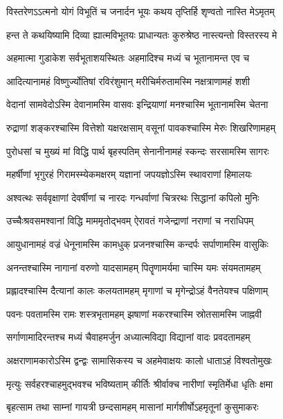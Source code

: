 \twolineshloka
{विस्तरेणऽऽत्मनो योगं विभूतिं च जनार्दन}
{भूयः कथय तृप्तिर्हि शृण्वतो नास्ति मेऽमृतम्}%

\twolineshloka
{हन्त ते कथयिष्यामि दिव्या ह्यात्मविभूतयः}
{प्राधान्यतः कुरुश्रेष्ठ नास्त्यन्तो विस्तरस्य मे}%

\twolineshloka
{अहमात्मा गुडाकेश सर्वभूताशयस्थितः}
{अहमादिश्च मध्यं च भूतानामन्त एव च}%

\twolineshloka
{आदित्यानामहं विष्णुर्ज्योतिषां रविरंशुमान्}
{मरीचिर्मरुतामस्मि नक्षत्राणामहं शशी}%

\twolineshloka
{वेदानां सामवेदोऽस्मि देवानामस्मि वासवः}
{इन्द्रियाणां मनश्चास्मि भूतानामस्मि चेतना}%

\twolineshloka
{रुद्राणां शङ्करश्चास्मि वित्तेशो यक्षरक्षसाम्}
{वसूनां पावकश्चास्मि मेरुः शिखरिणामहम्}%

\twolineshloka
{पुरोधसां च मुख्यं मां विद्धि पार्थ बृहस्पतिम्}
{सेनानीनामहं स्कन्दः सरसामस्मि सागरः}%

\twolineshloka
{महर्षीणां भृगुरहं गिरामस्म्येकमक्षरम्}
{यज्ञानां जपयज्ञोऽस्मि स्थावराणां हिमालयः}%

\twolineshloka
{अश्वत्थः सर्ववृक्षाणां देवर्षीणां च नारदः}
{गन्धर्वाणां चित्ररथः सिद्धानां कपिलो मुनिः}%

\twolineshloka
{उच्चैःश्रवसमश्वानां विद्धि माममृतोद्भवम्}
{ऐरावतं गजेन्द्राणां नराणां च नराधिपम्}%

\twolineshloka
{आयुधानामहं वज्रं धेनूनामस्मि कामधुक्}
{प्रजनश्चास्मि कन्दर्पः सर्पाणामस्मि वासुकिः}%

\twolineshloka
{अनन्तश्चास्मि नागानां वरुणो यादसामहम्}
{पितॄणामर्यमा चास्मि यमः संयमतामहम्}%

\twolineshloka
{प्रह्लादश्चास्मि दैत्यानां कालः कलयतामहम्}
{मृगाणां च मृगेन्द्रोऽहं वैनतेयश्च पक्षिणाम्}%

\twolineshloka
{पवनः पवतामस्मि रामः शस्त्रभृतामहम्}
{झषाणां मकरश्चास्मि स्रोतसामस्मि जाह्नवी}%

\twolineshloka
{सर्गाणामादिरन्तश्च मध्यं चैवाहमर्जुन}
{अध्यात्मविद्या विद्यानां वादः प्रवदतामहम्}%

\twolineshloka
{अक्षराणामकारोऽस्मि द्वन्द्वः सामासिकस्य च}
{अहमेवाक्षयः कालो धाताऽहं विश्वतोमुखः}%

\twolineshloka
{मृत्युः सर्वहरश्चाहमुद्भवश्च भविष्यताम्}
{कीर्तिः श्रीर्वाक्च नारीणां स्मृतिर्मेधा धृतिः क्षमा}%

\twolineshloka
{बृहत्साम तथा साम्नां गायत्री छन्दसामहम्}
{मासानां मार्गशीर्षोऽहमृतूनां कुसुमाकरः}%

